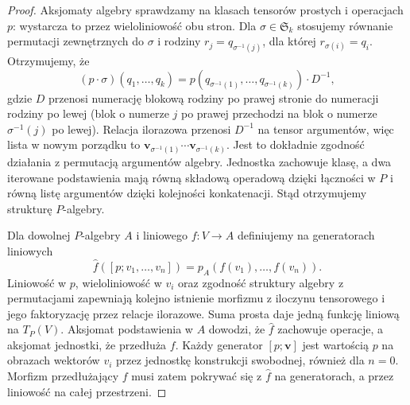 \begin{proof}
Aksjomaty algebry sprawdzamy na klasach tensorów prostych i operacjach $p$: wystarcza to przez wieloliniowość obu stron. Dla $\sigma\in\mathfrak S_k$ stosujemy równanie permutacji zewnętrznych do $\sigma$ i rodziny $r_j=q_{\sigma^{-1}(j)}$, dla której $r_{\sigma(i)}=q_i$. Otrzymujemy, że
\[
 (p\cdot\sigma)(q_1,\ldots,q_k)
 =p(q_{\sigma^{-1}(1)},\ldots,q_{\sigma^{-1}(k)})\cdot D^{-1},
\]
gdzie $D$ przenosi numerację blokową rodziny po prawej stronie do numeracji rodziny po lewej (blok o numerze $j$ po prawej przechodzi na blok o numerze $\sigma^{-1}(j)$ po lewej). Relacja ilorazowa przenosi $D^{-1}$ na tensor argumentów, więc lista w nowym porządku to $\mathbf v_{\sigma^{-1}(1)}\cdots\mathbf v_{\sigma^{-1}(k)}$. Jest to dokładnie zgodność działania z permutacją argumentów algebry. Jednostka zachowuje klasę, a dwa iterowane podstawienia mają równą składową operadową dzięki łączności w $P$ i równą listę argumentów dzięki kolejności konkatenacji. Stąd otrzymujemy strukturę $P$-algebry.

Dla dowolnej $P$-algebry $A$ i liniowego $f:V\to A$ definiujemy na generatorach liniowych
\[
 \widehat f([p;v_1,\ldots,v_n])=p_A(f(v_1),\ldots,f(v_n)).
\]
Liniowość w $p$, wieloliniowość w $v_i$ oraz zgodność struktury algebry z permutacjami zapewniają kolejno istnienie morfizmu z iloczynu tensorowego i jego faktoryzację przez relacje ilorazowe. Suma prosta daje jedną funkcję liniową na $T_P(V)$. Aksjomat podstawienia w $A$ dowodzi, że $\widehat f$ zachowuje operacje, a aksjomat jednostki, że przedłuża $f$. Każdy generator $[p;\mathbf v]$ jest wartością $p$ na obrazach wektorów $v_i$ przez jednostkę konstrukcji swobodnej, również dla $n=0$. Morfizm przedłużający $f$ musi zatem pokrywać się z $\widehat f$ na generatorach, a przez liniowość na całej przestrzeni.
\end{proof}


